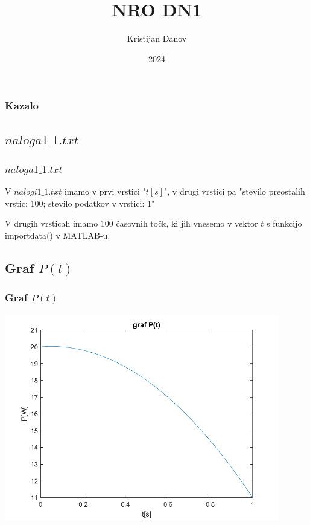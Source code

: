 \documentclass{beamer}
\title{NRO DN1}
\author{Kristijan Danov}
\date{2024}
\begin{document}

\frame{\titlepage}

\begin{frame}
\frametitle{Kazalo}
    \tableofcontents
\end{frame}

\begin{frame}
\section{$naloga1\_1.txt$}
\frametitle{$naloga1\_1.txt$}
    V $nalogi1\_1.txt$ imamo v prvi vrstici "$t[s]$", v drugi vrstici pa "stevilo preostalih  vrstic: 100; stevilo podatkov v vrstici: 1" \newline
    
    V drugih vrsticah imamo 100 časovnih točk, ki jih vnesemo v vektor $t$ s funkcijo importdata() v MATLAB-u.
\end{frame}

\begin{frame}
\section{Graf $P(t)$}
\frametitle{Graf $P(t)$}
    \includegraphics[width=0.9\textwidth]{graf.png}
    \centering
\end{frame}
\end{document}

